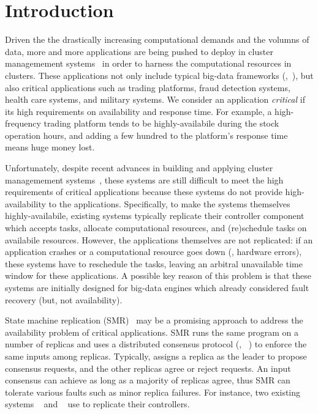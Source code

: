 \section{Introduction} \label{sec:intro}

Driven the the drastically increasing computational demands and the volumns of 
data, more and more applications are being pushed to deploy in cluster 
managemement systems~\cite{mesos,borg,helix,yarn} in order to harness the 
computational resources in clusters. These applications not only include typical 
big-data frameworks (\eg,~\cite{spark}), but also critical applications such as 
trading platforms, fraud detection systems, health care systems, and military 
systems. We consider an application \emph{critical} if its high requirements on 
availability and response time. For example, a high-frequency trading platform 
tends to be highly-availabile during the stock operation hours, and adding a 
few hundred \us to the platform's response time means huge money lost.

Unfortunately, despite recent advances in building and applying cluster 
managemement systems~\cite{mesos,borg,helix,yarn}, these systems are still 
difficult to meet the high requirements of critical applications because these 
systems do not provide high-availability to the applications. Specifically, to 
make the systems themselves highly-availabile, existing systems typically 
replicate their controller component which accepts tasks, allocate 
computational resources, and (re)schedule tasks on availabile resources. 
However, the applications themselves are not replicated: if an application 
crashes or a computational resource goes down (\eg, hardware errors), these 
systems have to reschedule the tasks, leaving an arbitral unavailable time 
window for these applications. A possible key reason of this problem is that 
these systems are initially designed for big-data engines which already 
considered fault recovery (but, not availability).

State machine replication (SMR)~\cite{paxos} may be a promising approach 
to address the availability problem of critical applications. SMR runs the 
same program on a number of replicas and uses a distributed consensus protocol 
(\eg, 
\paxos~\cite{paxos:practical,paxos,paxos:simple,paxos:complex,epaxos:sosp13}) 
to enforce the same inputs among 
replicas. Typically, \paxos assigns a replica as the leader to propose 
consensus requests, and the other replicas agree or reject requests. 
An input consensus can achieve as long as a majority of replicas 
agree, thus SMR can tolerate various faults such as minor replica failures. For 
instance, two existing systems \borg~\cite{borg} and \mesos~\cite{borg} use 
\paxos to replicate their controllers.

